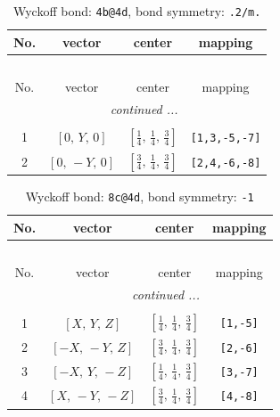 \documentclass[fleqn,8pt]{jsarticle}
\begin{document}
\renewcommand{\arraystretch}{1.2}
\begin{longtable}{cccc}
\caption{Wyckoff bond: {\tt 4b@4d}, bond symmetry: {\tt .2/m.}}
 \\
 \hline \hline
No. & vector & center & mapping \\ \hline \endfirsthead

\multicolumn{3}{l}{\tablename\ \thetable{}} \\
 \hline \hline
No. & vector & center & mapping \\ \hline \endhead

 \hline \hline
\multicolumn{3}{r}{\footnotesize\it continued ...} \\ \endfoot

 \hline \hline
\multicolumn{3}{r}{} \\ \endlastfoot

1 & $\left[ 0,\, Y,\, 0 \right]$ & $\left[ \frac{1}{4},\, \frac{1}{4},\, \frac{3}{4} \right]$ & {\tt [1,3,-5,-7]} \\ \hline
2 & $\left[ 0,\, - Y,\, 0 \right]$ & $\left[ \frac{3}{4},\, \frac{1}{4},\, \frac{3}{4} \right]$ & {\tt [2,4,-6,-8]} \\
\end{longtable}
\renewcommand{\arraystretch}{1.2}
\begin{longtable}{cccc}
\caption{Wyckoff bond: {\tt 8c@4d}, bond symmetry: {\tt -1}}
 \\
 \hline \hline
No. & vector & center & mapping \\ \hline \endfirsthead

\multicolumn{3}{l}{\tablename\ \thetable{}} \\
 \hline \hline
No. & vector & center & mapping \\ \hline \endhead

 \hline \hline
\multicolumn{3}{r}{\footnotesize\it continued ...} \\ \endfoot

 \hline \hline
\multicolumn{3}{r}{} \\ \endlastfoot

1 & $\left[ X,\, Y,\, Z \right]$ & $\left[ \frac{1}{4},\, \frac{1}{4},\, \frac{3}{4} \right]$ & {\tt [1,-5]} \\ \hline
2 & $\left[ - X,\, - Y,\, Z \right]$ & $\left[ \frac{3}{4},\, \frac{1}{4},\, \frac{3}{4} \right]$ & {\tt [2,-6]} \\ \hline
3 & $\left[ - X,\, Y,\, - Z \right]$ & $\left[ \frac{1}{4},\, \frac{1}{4},\, \frac{3}{4} \right]$ & {\tt [3,-7]} \\ \hline
4 & $\left[ X,\, - Y,\, - Z \right]$ & $\left[ \frac{3}{4},\, \frac{1}{4},\, \frac{3}{4} \right]$ & {\tt [4,-8]} \\
\end{longtable}
\end{document}
